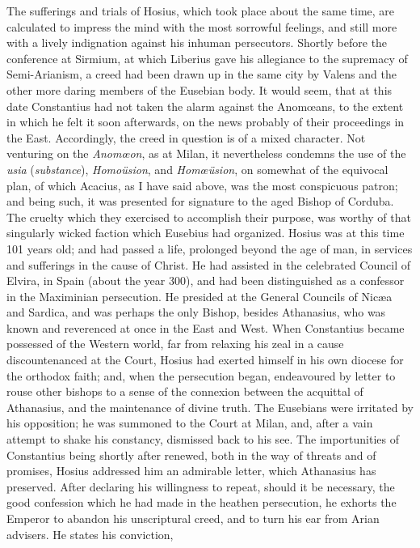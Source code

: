 The sufferings and trials of Hosius, which took place about the
same time, are calculated to impress the mind with the most sorrowful
feelings, and still more with a lively indignation against his inhuman
persecutors. Shortly before the conference at Sirmium, at which
Liberius gave his allegiance to the supremacy of Semi-Arianism, a
creed had been drawn up in the same city by Valens and the other more
daring members of the Eusebian body. It would seem, that at this date
Constantius had not taken the alarm against the Anomœans, to the
extent in which he felt it soon afterwards, on the news probably of
their proceedings in the East. Accordingly, the creed in question is
of a mixed character. Not venturing on the \emph{Anomœon}, as at
Milan, it nevertheless condemns the use of the \emph{usia} (\emph{substance}),
\emph{Homoüsion}, and \emph{Homœüsion}, on somewhat of the
equivocal plan, of which Acacius, as I have said above, was the most
conspicuous patron; and being such, it was presented for signature to
the aged Bishop of Corduba. The cruelty which they exercised to
accomplish their purpose, was worthy of that singularly wicked faction
which Eusebius had organized. Hosius was at this time 101 years old;
and had passed a life, prolonged beyond the age of man, in services
and sufferings in the cause of Christ. He had assisted in the
celebrated Council of Elvira, in Spain (about the year 300), and had
been distinguished as a confessor in the Maximinian persecution. He
presided at the General Councils of Nicæa and Sardica, and was
perhaps the only Bishop, besides Athanasius, who was known and
reverenced at once in the East and West. When Constantius became
possessed of the Western world, far from relaxing his zeal in a cause
discountenanced at the Court, Hosius had exerted himself in his own
diocese for the orthodox faith; and, when the persecution began,
endeavoured by letter to rouse other bishops to a sense of the
connexion between the acquittal of Athanasius, and the maintenance of
divine truth. The Eusebians were irritated by his opposition; he was
summoned to the Court at Milan, and, after a vain attempt to shake his
constancy, dismissed back to his see. The importunities of Constantius
being shortly after renewed, both in the way of threats and of
promises, Hosius addressed him an admirable letter, which Athanasius
has preserved. After declaring his willingness to repeat, should it be
necessary, the good confession which he had made in the heathen
persecution, he exhorts the Emperor to abandon his unscriptural creed,
and to turn his ear from Arian advisers. He states his conviction,
